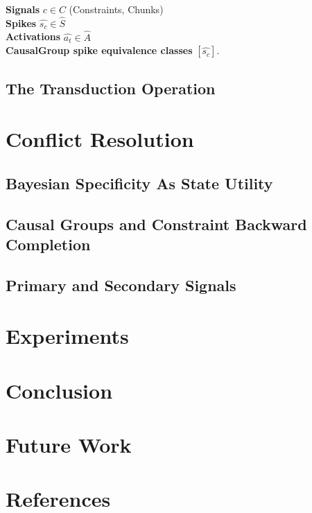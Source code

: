 \documentclass{article}
\begin{document}
\begin{multicols}{2}
\textbf{Signals} $c \in C$ (Constraints, Chunks)\\

\textbf{Spikes} $\hat{s_c} \in \hat{S}$\\

\textbf{Activations} $\hat{a_t} \in \hat{A}$\\

\textbf{CausalGroup spike equivalence classes} $[\hat{s_c}]$.\\

\subsection{The Transduction Operation}

\section{Conflict Resolution}

\subsection{Bayesian Specificity As State Utility}

\subsection{Causal Groups and Constraint Backward Completion}

\subsection{Primary and Secondary Signals}

\section{Experiments}


\section{Conclusion}


\section{Future Work}


\section{References}


\end{multicols}
\end{document}

